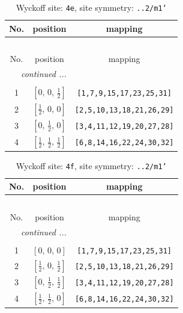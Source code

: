 \documentclass[fleqn,8pt]{jsarticle}
\begin{document}
\renewcommand{\arraystretch}{1.2}
\begin{longtable}{ccc}
\caption{Wyckoff site: {\tt 4e}, site symmetry: {\tt ..2/m1'}}
 \\
 \hline \hline
No. & position & mapping \\ \hline \endfirsthead

\multicolumn{2}{l}{\tablename\ \thetable{}} \\
 \hline \hline
No. & position & mapping \\ \hline \endhead

 \hline \hline
\multicolumn{2}{r}{\footnotesize\it continued ...} \\ \endfoot

 \hline \hline
\multicolumn{2}{r}{} \\ \endlastfoot

1 & $\left[ 0,\, 0,\, \frac{1}{2} \right]$ & {\tt [1,7,9,15,17,23,25,31]} \\ \hline
2 & $\left[ \frac{1}{2},\, 0,\, 0 \right]$ & {\tt [2,5,10,13,18,21,26,29]} \\ \hline
3 & $\left[ 0,\, \frac{1}{2},\, 0 \right]$ & {\tt [3,4,11,12,19,20,27,28]} \\ \hline
4 & $\left[ \frac{1}{2},\, \frac{1}{2},\, \frac{1}{2} \right]$ & {\tt [6,8,14,16,22,24,30,32]} \\
\end{longtable}
\renewcommand{\arraystretch}{1.2}
\begin{longtable}{ccc}
\caption{Wyckoff site: {\tt 4f}, site symmetry: {\tt ..2/m1'}}
 \\
 \hline \hline
No. & position & mapping \\ \hline \endfirsthead

\multicolumn{2}{l}{\tablename\ \thetable{}} \\
 \hline \hline
No. & position & mapping \\ \hline \endhead

 \hline \hline
\multicolumn{2}{r}{\footnotesize\it continued ...} \\ \endfoot

 \hline \hline
\multicolumn{2}{r}{} \\ \endlastfoot

1 & $\left[ 0,\, 0,\, 0 \right]$ & {\tt [1,7,9,15,17,23,25,31]} \\ \hline
2 & $\left[ \frac{1}{2},\, 0,\, \frac{1}{2} \right]$ & {\tt [2,5,10,13,18,21,26,29]} \\ \hline
3 & $\left[ 0,\, \frac{1}{2},\, \frac{1}{2} \right]$ & {\tt [3,4,11,12,19,20,27,28]} \\ \hline
4 & $\left[ \frac{1}{2},\, \frac{1}{2},\, 0 \right]$ & {\tt [6,8,14,16,22,24,30,32]} \\
\end{longtable}
\end{document}
